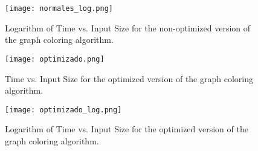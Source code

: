\documentclass[british,a4paper,11pt,titlepage]{article}
\begin{document}
\begin{figure}[p]
  \centering
  \texttt{[image: normales\_log.png]}%
  \hspace{0.1\linewidth}%
  \caption[Logarithm of Time vs Input Size (classic version)]{Logarithm of Time vs. Input Size for the non-optimized version of the graph coloring algorithm.}
  \label{fig:res_normales_log}
\end{figure}

\begin{figure}[p]
  \centering
  \texttt{[image: optimizado.png]}%
  \hspace{0.1\linewidth}%
  \caption[Time vs Input Size (optimized version)]{Time vs. Input Size for the optimized version of the graph coloring algorithm.}
  \label{fig:res_optimizado}
\end{figure}

\begin{figure}[p]
  \centering
  \texttt{[image: optimizado\_log.png]}%
  \hspace{0.1\linewidth}%
  \caption[Logarithm of Time vs Input Size (optimized version)]{Logarithm of Time vs. Input Size for the optimized version of the graph coloring algorithm.}
  \label{fig:res_optimizado_log}
\end{figure}

\clearpage

\end{document}
